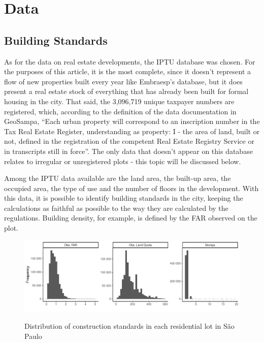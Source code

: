 \chapter{Data}
\label{chp:data}

\section{Building Standards}
\label{sec:dadosIPTU}

As for the data on real estate developments, the IPTU database was chosen. For the purposes of this article, it is the most complete, since it doesn't represent a flow of new properties built every year like Embraesp's database, but it does present a real estate stock of everything that has already been built for formal housing in the city. That said, the 3,096,719 unique taxpayer numbers are registered, which, according to the definition of the data documentation in GeoSampa, ``Each urban property will correspond to an inscription number in the Tax Real Estate Register, understanding as property: I - the area of land, built or not, defined in the registration of the competent Real Estate Registry Service or in transcripts still in force''. The only data that doesn't appear on this database relates to irregular or unregistered plots - this topic will be discussed below.

Among the IPTU data available are the land area, the built-up area, the occupied area, the type of use and the number of floors in the development. With this data, it is possible to identify building standards in the city, keeping the calculations as faithful as possible to the way they are calculated by the regulations. Building density, for example, is defined by the FAR observed on the plot.

\begin{figure}[h]
    \centering
    \caption{Distribution of construction standards in each residential lot in São Paulo}
    \includegraphics[width = \linewidth]{figuras/indicadores.pdf}
    \label{fig:histograms}
\end{figure}

